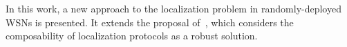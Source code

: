




In this work, a new approach to the localization problem in randomly-deployed WSNs is presented. It extends the proposal of~\cite{composability}, which considers the composability of localization protocols as a robust solution. 

